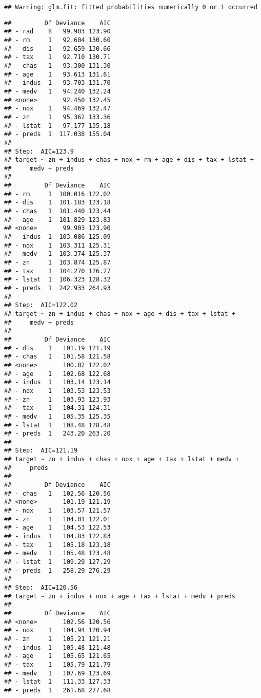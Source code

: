 \documentclass[
]{article}
\begin{document}
\begin{verbatim}
## Warning: glm.fit: fitted probabilities numerically 0 or 1 occurred
\end{verbatim}

\begin{verbatim}
##         Df Deviance    AIC
## - rad    8   99.903 123.90
## - rm     1   92.604 130.60
## - dis    1   92.659 130.66
## - tax    1   92.710 130.71
## - chas   1   93.300 131.30
## - age    1   93.613 131.61
## - indus  1   93.703 131.70
## - medv   1   94.240 132.24
## <none>       92.450 132.45
## - nox    1   94.469 132.47
## - zn     1   95.362 133.36
## - lstat  1   97.177 135.18
## - preds  1  117.038 155.04
## 
## Step:  AIC=123.9
## target ~ zn + indus + chas + nox + rm + age + dis + tax + lstat + 
##     medv + preds
## 
##         Df Deviance    AIC
## - rm     1  100.016 122.02
## - dis    1  101.183 123.18
## - chas   1  101.440 123.44
## - age    1  101.829 123.83
## <none>       99.903 123.90
## - indus  1  103.086 125.09
## - nox    1  103.311 125.31
## - medv   1  103.374 125.37
## - zn     1  103.874 125.87
## - tax    1  104.270 126.27
## - lstat  1  106.323 128.32
## - preds  1  242.933 264.93
## 
## Step:  AIC=122.02
## target ~ zn + indus + chas + nox + age + dis + tax + lstat + 
##     medv + preds
## 
##         Df Deviance    AIC
## - dis    1   101.19 121.19
## - chas   1   101.58 121.58
## <none>       100.02 122.02
## - age    1   102.68 122.68
## - indus  1   103.14 123.14
## - nox    1   103.53 123.53
## - zn     1   103.93 123.93
## - tax    1   104.31 124.31
## - medv   1   105.35 125.35
## - lstat  1   108.48 128.48
## - preds  1   243.20 263.20
## 
## Step:  AIC=121.19
## target ~ zn + indus + chas + nox + age + tax + lstat + medv + 
##     preds
## 
##         Df Deviance    AIC
## - chas   1   102.56 120.56
## <none>       101.19 121.19
## - nox    1   103.57 121.57
## - zn     1   104.01 122.01
## - age    1   104.53 122.53
## - indus  1   104.83 122.83
## - tax    1   105.18 123.18
## - medv   1   105.48 123.48
## - lstat  1   109.29 127.29
## - preds  1   258.29 276.29
## 
## Step:  AIC=120.56
## target ~ zn + indus + nox + age + tax + lstat + medv + preds
## 
##         Df Deviance    AIC
## <none>       102.56 120.56
## - nox    1   104.94 120.94
## - zn     1   105.21 121.21
## - indus  1   105.48 121.48
## - age    1   105.65 121.65
## - tax    1   105.79 121.79
## - medv   1   107.69 123.69
## - lstat  1   111.33 127.33
## - preds  1   261.68 277.68
\end{verbatim}
\end{document}
